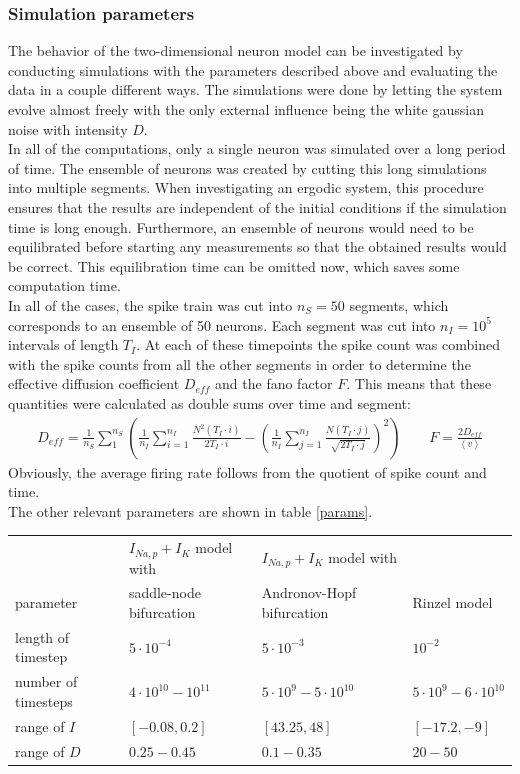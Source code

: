 \documentclass[12pt,a4paper]{article}
\begin{document}
\subsubsection{Simulation parameters}
The behavior of the two-dimensional neuron model can be investigated by conducting simulations with the parameters described above and evaluating the data in a couple different ways. The simulations were done by letting the system evolve almost freely with the only external influence being the white gaussian noise with intensity $D$. \\
In all of the computations, only a single neuron was simulated over a long period of time. The ensemble of neurons was created by cutting this long simulations into multiple segments. When investigating an ergodic system, this procedure ensures that the results are independent of the initial conditions if the simulation time is long enough. Furthermore, an ensemble of neurons would need to be equilibrated before starting any measurements so that the obtained results would be correct. This equilibration time can be omitted now, which saves some computation time. \\
In all of the cases, the spike train was cut into $n_S=50$ segments, which corresponds to an ensemble of 50 neurons. Each segment was cut into $n_I=10^5$ intervals of length $T_I$. At each of these timepoints the spike count was combined with the spike counts from all the other segments in order to determine the effective diffusion coefficient $D_{eff}$ and the fano factor $F$. This means that these quantities were calculated as double sums over time and segment:
\begin{align*}
D_{eff}=\frac{1}{n_S}\sum_{1}^{n_S}\left(\frac{1}{n_I}\sum_{i=1}^{n_I}\frac{N^2(T_I\cdot i)}{2T_I\cdot i}-\left(\frac{1}{n_I}\sum_{j=1}^{n_I}\frac{N(T_I\cdot j)}{\sqrt{2T_I\cdot j}}\right)^2\right)\qquad F=\frac{2D_{eff}}{\left<v\right>}
\end{align*}
Obviously, the average firing rate follows from the quotient of spike count and time.\\
The other relevant parameters are shown in table \ref{params}.
\begin{tabular}{l|l|l|l}
	\label{params}
	 & $I_{Na,p}+I_K$ model with  & $I_{Na,p}+I_K$ model with  & \\ parameter & saddle-node bifurcation& Andronov-Hopf bifurcation &Rinzel model\\
	\hline
	length of timestep&$5\cdot 10^{-4}$&$5\cdot10^{-3}$&$10^{-2}$\\\hline
	number of timesteps&$4\cdot10^{10}-10^{11}$&$5\cdot10^9-5\cdot10^{10}$&$5\cdot10^9-6\cdot10^{10}$\\\hline
	range of $I$&$[-0.08,0.2]$&$[43.25,48]$&$[-17.2,-9]$\\\hline
	range of $D$&$0.25-0.45$&$0.1-0.35$&$20-50$
\end{tabular}
\end{document}
